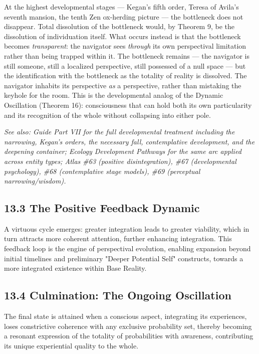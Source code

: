 At the highest developmental stages — Kegan's fifth order, Teresa of Avila's seventh mansion, the tenth Zen ox-herding picture — the bottleneck does not disappear. Total dissolution of the bottleneck would, by Theorem 9, be the dissolution of individuation itself. What occurs instead is that the bottleneck becomes \textit{transparent}: the navigator sees \textit{through} its own perspectival limitation rather than being trapped within it. The bottleneck remains — the navigator is still someone, still a localized perspective, still possessed of a null space — but the identification with the bottleneck as the totality of reality is dissolved. The navigator inhabits its perspective \textit{as} a perspective, rather than mistaking the keyhole for the room. This is the developmental analog of the Dynamic Oscillation (Theorem 16): consciousness that can hold both its own particularity and its recognition of the whole without collapsing into either pole.


\textit{See also: Guide Part VII for the full developmental treatment including the narrowing, Kegan's orders, the necessary fall, contemplative development, and the deepening container; Ecology Development Pathways for the same arc applied across entity types; Atlas \#63 (positive disintegration), \#67 (developmental psychology), \#68 (contemplative stage models), \#69 (perceptual narrowing/wisdom).}


\subsection*{13.3 The Positive Feedback Dynamic}


A virtuous cycle emerges: greater integration leads to greater viability, which in turn attracts more coherent attention, further enhancing integration. This feedback loop is the engine of perspectival evolution, enabling expansion beyond initial timelines and preliminary "Deeper Potential Self" constructs, towards a more integrated existence within Base Reality.


\subsection*{13.4 Culmination: The Ongoing Oscillation}


The final state is attained when a conscious aspect, integrating its experiences, loses constrictive coherence with any exclusive probability set, thereby becoming a resonant expression of the totality of probabilities with awareness, contributing its unique experiential quality to the whole.


